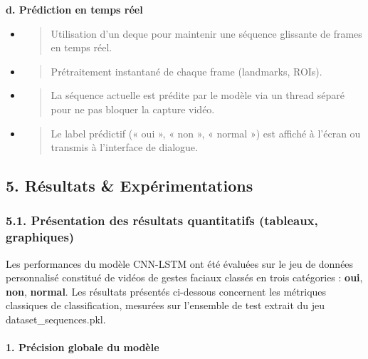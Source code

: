 \documentclass[
]{article}
\begin{document}
\textbf{d. Prédiction en temps réel}

\begin{itemize}
\item
  \begin{quote}
  Utilisation d'un deque pour maintenir une séquence glissante de frames en temps réel.
  \end{quote}
\item
  \begin{quote}
  Prétraitement instantané de chaque frame (landmarks, ROIs).
  \end{quote}
\item
  \begin{quote}
  La séquence actuelle est prédite par le modèle via un thread séparé pour ne pas bloquer la capture vidéo.
  \end{quote}
\item
  \begin{quote}
  Le label prédictif (« oui », « non », « normal ») est affiché à l'écran ou transmis à l'interface de dialogue.
  \end{quote}
\end{itemize}

\hypertarget{ruxe9sultats-expuxe9rimentations}{%
\subsection{5. Résultats \& Expérimentations}\label{ruxe9sultats-expuxe9rimentations}}

\hypertarget{pruxe9sentation-des-ruxe9sultats-quantitatifs-tableaux-graphiques}{%
\subsubsection{5.1. Présentation des résultats quantitatifs (tableaux, graphiques)}\label{pruxe9sentation-des-ruxe9sultats-quantitatifs-tableaux-graphiques}}

Les performances du modèle CNN-LSTM ont été évaluées sur le jeu de données personnalisé constitué de vidéos de gestes faciaux classés en trois catégories : \textbf{oui}, \textbf{non}, \textbf{normal}. Les résultats présentés ci-dessous concernent les métriques classiques de classification, mesurées sur l'ensemble de test extrait du jeu dataset\_sequences.pkl.

\hypertarget{pruxe9cision-globale-du-moduxe8le}{%
\paragraph{\texorpdfstring{\textbf{1. Précision globale du modèle}}{1. Précision globale du modèle}}\label{pruxe9cision-globale-du-moduxe8le}}
\end{document}
